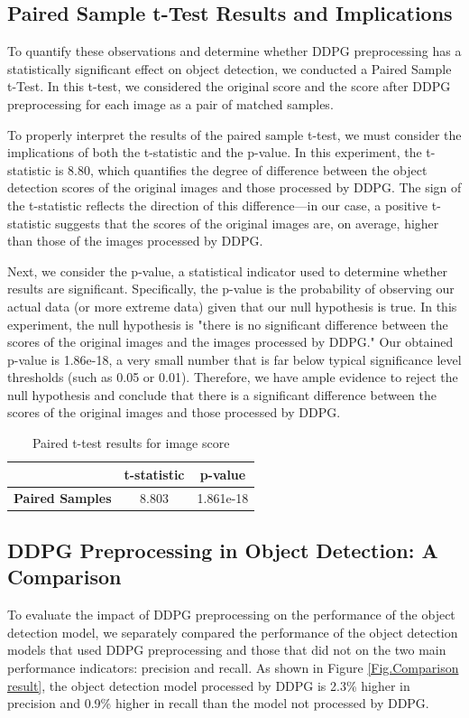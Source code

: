 \documentclass{PHlab-thesis}
\begin{document}
\subsection{Paired Sample t-Test Results and Implications}
To quantify these observations and determine whether DDPG preprocessing has a statistically significant effect on object detection, we conducted a Paired Sample t-Test. In this t-test, we considered the original score and the score after DDPG preprocessing for each image as a pair of matched samples.

To properly interpret the results of the paired sample t-test, we must consider the implications of both the t-statistic and the p-value. In this experiment, the t-statistic is 8.80, which quantifies the degree of difference between the object detection scores of the original images and those processed by DDPG. The sign of the t-statistic reflects the direction of this difference—in our case, a positive t-statistic suggests that the scores of the original images are, on average, higher than those of the images processed by DDPG.

Next, we consider the p-value, a statistical indicator used to determine whether results are significant. Specifically, the p-value is the probability of observing our actual data (or more extreme data) given that our null hypothesis is true. In this experiment, the null hypothesis is "there is no significant difference between the scores of the original images and the images processed by DDPG." Our obtained p-value is 1.86e-18, a very small number that is far below typical significance level thresholds (such as 0.05 or 0.01). Therefore, we have ample evidence to reject the null hypothesis and conclude that there is a significant difference between the scores of the original images and those processed by DDPG.

\begin{table}[H]
    \centering
    \label{table:t_test_results} 
    \begin{tabular}{c c c}
        \toprule
        & \textbf{t-statistic} & \textbf{p-value} \\
        \midrule
        \textbf{Paired Samples} & 8.803 & 1.861e-18 \\
        \bottomrule
    \end{tabular}
    \caption{Paired t-test results for image score}
\end{table}

\subsection{DDPG Preprocessing in Object Detection: A Comparison}
To evaluate the impact of DDPG preprocessing on the performance of the object detection model, we separately compared the performance of the object detection models that used DDPG preprocessing and those that did not on the two main performance indicators: precision and recall. As shown in Figure \ref{Fig.Comparison result}, the object detection model processed by DDPG is 2.3\% higher in precision and 0.9\% higher in recall than the model not processed by DDPG.
\end{document}
